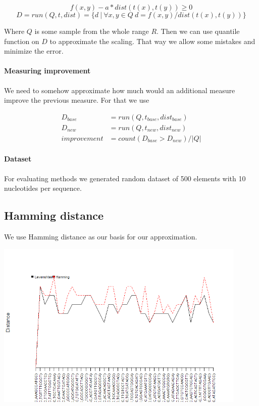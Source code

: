 \documentclass [12pt, a4]{article} %
\begin{document}
$$f(x,y) - a*dist(t(x),t(y)) \geq 0$$
$$D = run(Q, t, dist) = \{ d ~ | ~ \forall x,y \in Q ~ d = f(x,y) / dist(t(x),t(y)) \}$$

Where $Q$ is some sample from the whole range $R$. Then we can use quantile function on $D$ to approximate the scaling. That way we allow some mistakes and minimize the error.

\paragraph{Measuring improvement}

We need to somehow approximate how much would an additional measure improve the previous measure. For that we use

\begin{align*}
D_{base} &= run(Q, t_{base}, dist_{base}) \\
D_{new} &= run(Q, t_{new}, dist_{new}) \\
improvement &= count(D_{base} > D_{new} ) / |Q|
\end{align*}

\paragraph{Dataset}

For evaluating methods we generated random dataset of 500 elements with 10 nucleotides per sequence.

\subsection{Hamming distance}

We use Hamming distance as our basis for our approximation.

\includegraphics[width=0.9\textwidth]{img/hamming.png}
\end{document}
